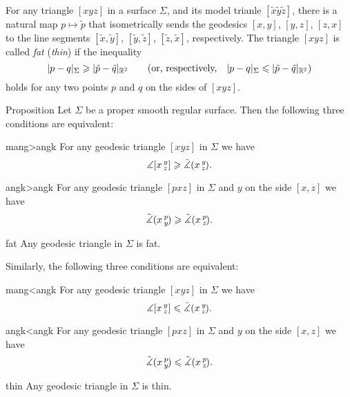 For any triangle $[xyz]$ in a surface $\Sigma$, and its model trianle $[\tilde x \tilde y \tilde z]$, there is a natural map $p\mapsto \tilde p$ that isometrically sends the geodesics $[x,y]$, $[y,z]$, $[z,x]$ to the line segments $[\tilde x,\tilde y ]$, $[\tilde y , \tilde z]$, $[ \tilde z , \tilde x ]$, respectively.
The triangle $[xyz]$ is called \emph{fat} (\emph{thin})
if the inequality
\[\dist{p}{q}{\Sigma}\ge |\tilde p- \tilde q|_{\mathbb{R}^2}\qquad \text{(or, respectively,}\quad \dist{p}{q}{\Sigma}\le |\tilde p- \tilde q|_{\mathbb{R}^2})\]
holds for any two points $p$ and $q$ on the sides of $[xyz]$.

\begin{thm}{Proposition}\label{prop:comp-reformulations}
Let $\Sigma$ be a proper smooth regular surface.
Then the following three conditions are equivalent:

\begin{subthm}{mang>angk}
For any geodesic triangle $[xyz]$ in $\Sigma$ we have
 \[\measuredangle[x\,{}^{y}_{z}]\geqslant\tilde\measuredangle(x\,{}^{y}_{z}\hspace{-0.2ex}).\]
\end{subthm}

\begin{subthm}{angk>angk} For any geodesic triangle $[pxz]$ in $\Sigma$ and $y$ on the side $[x,z]$ we have
 \[\tilde\measuredangle(x\,{}^{p}_{y}\hspace{-0.2ex}) \geqslant \tilde\measuredangle(x\,{}^{p}_{z}\hspace{-0.2ex}).\]
 
\end{subthm}

\begin{subthm}{fat}
 Any geodesic triangle in $\Sigma$ is fat.
\end{subthm}

\medskip

Similarly, the following three conditions are equivalent:

\begin{subthmA}{mang<angk}
For any geodesic triangle $[xyz]$ in $\Sigma$ we have
 \[\measuredangle[x\,{}^{y}_{z}]\leqslant\tilde\measuredangle(x\,{}^{y}_{z}\hspace{-0.2ex}).\]
\end{subthmA}

\begin{subthmA}{angk<angk} For any geodesic triangle $[pxz]$ in $\Sigma$ and $y$ on the side $[x,z]$ we have
 \[\tilde\measuredangle(x\,{}^{p}_{y}\hspace{-0.2ex}) \leqslant \tilde\measuredangle(x\,{}^{p}_{z}\hspace{-0.2ex}).\]
\end{subthmA}

\begin{subthmA}{thin}
Any geodesic triangle in $\Sigma$ is thin.
\end{subthmA}

\end{thm}

